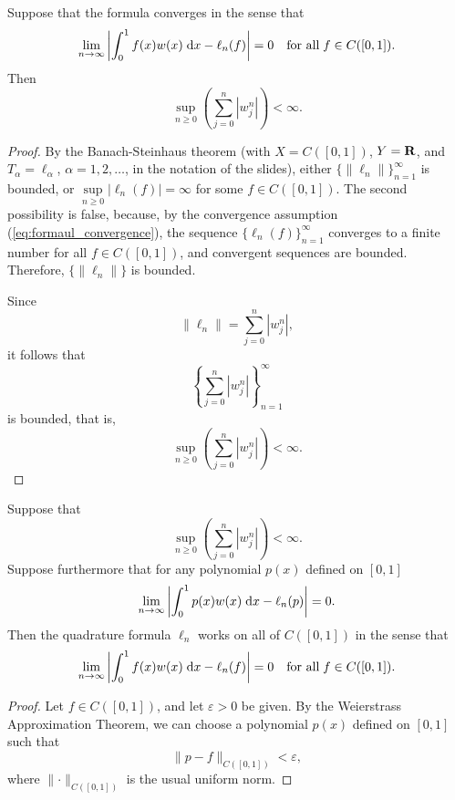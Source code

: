 \documentclass{homework}
\begin{document}
\begin{arabicparts}
		\questionpart
		Suppose that the formula converges in the sense that
		\begin{equation}
			\label{eq:formaul_convergence}
			\lim_{n\to\infty} \left|\int_0^1 f(x)w(x)\;\text{d} x - \ell_n(f)\right| = 0 \quad \text{for all}\; f\in C([0,1]).
		\end{equation}
		Then
		\begin{equation}
			\sup_{n\ge 0} \left(\sum_{j=0}^n |w_j^n|\right) < \infty.
		\end{equation}
		\begin{proof}
			By the Banach-Steinhaus theorem (with $X = C([0,1])$, $Y=\textbf{R}$, and $T_\alpha =\ell_\alpha$, $\alpha=1,2,\dots$, in the notation of the slides), either $\{\lVert\ell_n\rVert\}_{n=1}^\infty$ is bounded, or $\sup\limits_{n\ge 0}|\ell_n(f)| = \infty$ for some $f \in C([0,1])$. The second possibility is false, because, by the convergence assumption (\ref{eq:formaul_convergence}), the sequence $\{\ell_n(f)\}_{n=1}^\infty$ converges to a finite number for all $f \in C([0,1])$, and convergent sequences are bounded. Therefore, $\{\lVert \ell_n\rVert\}$ is bounded.
			
			Since
			\begin{equation}
				\lVert \ell_n\rVert = \sum_{j=0}^n |w_j^n|,
			\end{equation}
			it follows that
			\begin{equation}
				\left\{\sum_{j=0}^n |w_j^n|\right\}_{n=1}^\infty
			\end{equation}
			is bounded, that is,
			\begin{equation}
				\sup_{n\ge 0} \left(\sum_{j=0}^n |w_j^n|\right) < \infty.
			\end{equation}
		\end{proof}
		
		\questionpart Suppose that
		\begin{equation}
			\label{eq:ell_n_bounded}
			\sup_{n\ge 0} \left(\sum_{j=0}^n|w_j^n|\right) < \infty.
		\end{equation}
		Suppose furthermore that for any polynomial $p(x)$ defined on $[0,1]$
		\begin{equation}
			\label{eq:polynomial_convergence}
			\lim_{n\to\infty}\left|\int_0^1p(x)w(x)\;\text{d} x - \ell_n(p)\right| = 0.
		\end{equation}
		Then the quadrature formula $\ell_n$ works on all of $C([0,1])$ in the sense that
		\begin{equation}
			\lim_{n\to\infty}\left|\int_0^1 f(x)w(x)\;\text{d} x  - \ell_n(f)\right| = 0 \quad \text{for all} \; f\in C([0,1]).
		\end{equation}
		\begin{proof}
			Let $f \in C([0,1])$, and let $\varepsilon > 0$ be given. By the Weierstrass Approximation Theorem, we can choose a polynomial $p(x)$ defined on $[0,1]$ such that
			\begin{equation}
				\lVert p - f\rVert_{C([0,1])} < \varepsilon,
			\end{equation}
			where $\lVert \cdot \rVert_{C([0,1])}$ is the usual uniform norm.
		

\end{proof}
\end{arabicparts}
\end{document}
